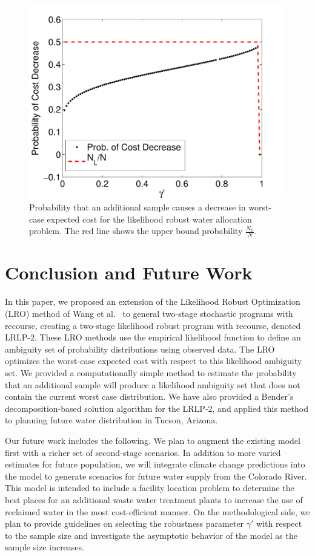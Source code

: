 \documentclass[11pt]{article}
\begin{document}
\begin{figure}
	\centering
	\includegraphics[width=.5\textwidth]{images/water_prob_decrease}
	\caption{Probability that an additional sample causes a decrease in worst-case expected cost for the likelihood robust water allocation problem.  The red line shows the upper bound probability $\tfrac{N_L}{N}$.}
	\label{fig:water_prob_decrease}
\end{figure}

\section{Conclusion and Future Work}
\label{sec:concl}

In this paper, we proposed an extension of the Likelihood Robust Optimization (LRO) method of Wang et al.\ \cite{wang2010likelihood} to general two-stage stochastic programs with recourse, creating a two-stage likelihood robust program with recourse, denoted LRLP-2.
These LRO methods use the empirical likelihood function to define an ambiguity set of probability distributions using observed data.
The LRO optimizes the worst-case expected cost with respect to this likelihood ambiguity set.
We provided a computationally simple method to estimate the probability that an additional sample will produce a likelihood ambiguity set that does not contain the current worst case distribution. We have also provided a Bender's decomposition-based solution algorithm for the LRLP-2, and applied this method to planning future water distribution in Tucson, Arizona.

Our future work includes the following. We plan to augment the existing model first with a richer set of second-stage scenarios.
In addition to more varied estimates for future population, we will integrate climate change predictions into the model to generate scenarios for future water supply from the Colorado River. 
This model is intended to include a facility location problem to determine the best places for an additional waste water treatment plants to increase the use of reclaimed water in the most cost-efficient manner. On the methodological side, we plan to provide guidelines on selecting the robustness parameter $\gamma'$ with respect to the sample size and investigate the asymptotic behavior of the model as the sample size increases. 


\end{document}
